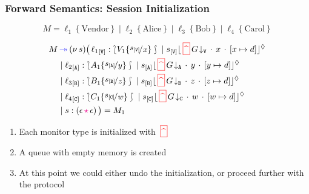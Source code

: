 \documentclass[12pt]{beamer}
\newcommand{\pS}{\ensuremath{\mathtt{V}}\xspace}
\newcommand{\epS}{\ep{s}{\mathtt{V}}}
\newcommand{\fwcolor}[1]{\textcolor{blue}{#1}}
\newcommand{\sepcolor}[1]{\textcolor{magenta}{#1}}
\newcommand{\upd}[2]{[#1\mapsto #2]}
\newcommand{\sred}[1]{\textcolor{myred}{#1}}
\newcommand{\news}[1]{(\nu\, #1)}
\newcommand{\bi}{\begin{enumerate}[$\bullet$]}
\newcommand{\ei}{\end{enumerate}}
\newcommand{\queue}[1]{\lfloor #1 \rfloor}
\newcommand{\mysepp}{\,\cdot\,}
\newcommand{\codah}[4]{\coda{#1}{(#2\,\history\,#3)\!#4}}
\newcommand{\history}{\sepcolor{\mathbf{\star}}}
\newcommand{\coda}[2]{#1:#2}
\newcommand{\hmoni}[4]{\ensuremath{{#1\queue{\textcolor{black}{#2}\mysepp #3\mysepp #4}^{\normark}}}}
\newcommand{\past}{\,\text{\textcolor{red}{\textbf{\textasciicircum}}}\,}
\newcommand{\mypast}{\,\sred{\framebox[3mm]{\past}\,}}
\newcommand{\conf}[2]{\lbag #2 \rbag} %
\newcommand{\tproj}[2]{#1\!\downarrow_{#2}}
\newcommand{\Par}{\;|\;}
\newcommand{\emp}{\epsilon}
\newcommand{\fw}{\ensuremath{\fwcolor{\,\twoheadrightarrow\,}}}
\newcommand{\key}[2]{#1_{[#2]}}
\newcommand{\np}[2]{#1:#2}
\newcommand{\ep}[2]{#1_{[#2]}}
\newcommand{\myloc}[2]{#1\left\{#2\right\}}
\newcommand{\loc}{\ell}
\newcommand{\normark}{\lozenge}
\newcommand{\inact}{\mathbf{0}}
\newcommand{\epA}{\ep{s}{\mathtt{A}}}
\newcommand{\pA}{\ensuremath{\mathtt{A}}\xspace}
\newcommand{\epB}{\ep{s}{\mathtt{B}}}
\newcommand{\pB}{\ensuremath{\mathtt{B}}\xspace}
\newcommand{\epC}{\ep{s}{\mathtt{C}}}
\newcommand{\pC}{\ensuremath{\mathtt{C}}\xspace}
\def\subst#1#2{\{\raisebox{.5ex}{\small$#1$}\! / \mbox{\small$#2$}\}}
\begin{document}
\begin{frame}
	\frametitle{Forward Semantics: Session Initialization}
	$$M = \myloc{\loc_1}{\text{Vendor}} 
\Par
\myloc{\loc_2}{\text{Alice}} 
\Par
\myloc{\loc_3}{\text{Bob}} 
\Par 
\myloc{\loc_4}{\text{Carol}} 
$$

	\begin{align*}
M & \fw  \news{s}\big(\, 
\np{\key{{\loc_1}}{\pS}}{ \conf{\inact}{V_1\subst{\epS}{x}}} \Par 
\hmoni{\ep{s}{\pS}}{\mypast \tproj{G}{\pS}}{x}{\upd{x}{d}}  
\\
& \Par \np{\key{{\loc_2}}{\pA}}{ \conf{\inact}{A_1\subst{\epA}{y}}} \Par 
\hmoni{\ep{s}{\pA}}{\mypast \tproj{G}{\pA}}{y}{\upd{y}{d}} 
\\
& \Par \np{\key{{\loc_3}}{\pB}}{ \conf{\inact}{B_1\subst{\epB}{z}}} \Par 
\hmoni{\ep{s}{\pB}}{\mypast \tproj{G}{\pB}}{z}{\upd{z}{d}} 
\\
& \Par \np{\key{{\loc_4}}{\pC}}{ \conf{\inact}{C_1\subst{\epC}{w}}} \Par 
\hmoni{\ep{s}{\pC}}{\mypast \tproj{G}{\pC}}{w}{\upd{w}{d}}  
\\
& \Par \codah{s}{\emp}{\emp}{}~\big)  = M_1
\end{align*}
\bi
	\item Each monitor type is initialized with $\mypast$
	\item A queue with empty memory is created
	\item At this point we could either undo the initialization, or proceed further with the protocol
\ei
\end{frame}
\end{document}
